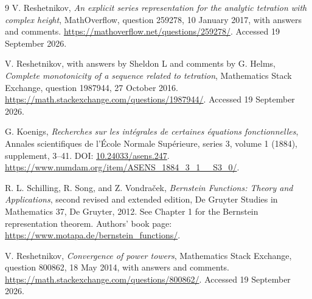 \documentclass[11pt,letterpaper]{article}
\theoremstyle{definition}\newtheorem{definition}[theorem]{Definition}
\theoremstyle{remark}\newtheorem{remark}[theorem]{Remark}
\numberwithin{equation}{section}
\begin{document}
\begin{thebibliography}{9}
V. Reshetnikov,
\emph{An explicit series representation for the analytic tetration with complex height},
MathOverflow, question 259278, 10 January 2017, with answers and comments.
\url{https://mathoverflow.net/questions/259278/}.
Accessed 19 September 2026.

V. Reshetnikov, with answers by Sheldon L and comments by G. Helms,
\emph{Complete monotonicity of a sequence related to tetration},
Mathematics Stack Exchange, question 1987944, 27 October 2016.
\url{https://math.stackexchange.com/questions/1987944/}.
Accessed 19 September 2026.

G. Koenigs,
\emph{Recherches sur les int\'egrales de certaines \'equations fonctionnelles},
Annales scientifiques de l'\'Ecole Normale Sup\'erieure, series 3, volume 1 (1884), supplement, 3--41.
DOI: \href{https://doi.org/10.24033/asens.247}{10.24033/asens.247}.
\url{https://www.numdam.org/item/ASENS_1884_3_1__S3_0/}.

R. L. Schilling, R. Song, and Z. Vondra\v{c}ek,
\emph{Bernstein Functions: Theory and Applications},
second revised and extended edition, De Gruyter Studies in Mathematics 37,
De Gruyter, 2012. See Chapter 1 for the Bernstein representation theorem.
Authors' book page:
\url{https://www.motapa.de/bernstein_functions/}.

V. Reshetnikov,
\emph{Convergence of power towers},
Mathematics Stack Exchange, question 800862, 18 May 2014, with answers and comments.
\url{https://math.stackexchange.com/questions/800862/}.
Accessed 19 September 2026.
\end{thebibliography}
\end{document}
